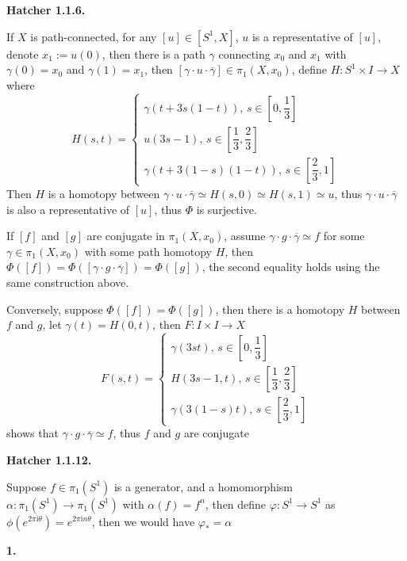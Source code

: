 \documentclass[../main.tex]{subfiles}
\begin{document}
\textbf{Hatcher 1.1.6.} \par
If $X$ is path-connected, for any $[u]\in [S^{1},X]$, $u$ is a representative of $[u]$, denote $x_{1}:=u(0)$, then there is a path $\gamma$ connecting $x_{0}$ and $x_{1}$ with $\gamma(0)=x_{0}$ and $\gamma(1)=x_{1}$, then $[\gamma\cdot u\cdot\overline{\gamma}]\in \pi_{1}(X,x_{0})$, define $H:S^{1}\times I\rightarrow X$ where
\[
H(s,t)=\left\{\begin{matrix}
\gamma\left( t+3s(1-t) \right), \, s\in[0,\dfrac{1}{3}]\\ 
u(3s-1), \, s\in[\dfrac{1}{3},\dfrac{2}{3}]\\ 
\gamma\left( t+3(1-s)(1-t) \right), \, s\in[\dfrac{2}{3},1]
\end{matrix}\right.
\]
Then $H$ is a homotopy between $\gamma\cdot u\cdot\overline{\gamma}\simeq H(s,0)\simeq H(s,1)\simeq u$, thus $\gamma\cdot u\cdot\overline{\gamma}$ is also a representative of $[u]$, thus $\Phi$ is surjective. \par
If $[f]$ and $[g]$ are conjugate in $\pi_{1}(X,x_{0})$, assume $\gamma\cdot g\cdot\overline{\gamma} \simeq f$ for some $\gamma\in\pi_{1}(X,x_{0})$ with some path homotopy $H$, then $\Phi([f])=\Phi([\gamma\cdot g\cdot\overline{\gamma}])=\Phi([g])$, the second equality holds using the same construction above. \par
Conversely, suppose $\Phi([f])=\Phi([g])$, then there is a homotopy $H$ between $f$ and $g$, let $\gamma(t) = H(0,t)$, then $F:I\times I\rightarrow X$
\[
F(s,t)=\left\{\begin{matrix}
\gamma\left(3st\right), \, s\in[0,\dfrac{1}{3}]\\ 
H\left(3s-1,t\right), \, s\in[\dfrac{1}{3},\dfrac{2}{3}]\\ 
\gamma\left(3(1-s)t\right), \, s\in[\dfrac{2}{3},1]
\end{matrix}\right.
\]
shows that $
\gamma\cdot g\cdot\overline{\gamma} \simeq f$, thus $f$ and $g$ are conjugate \par
\textbf{Hatcher 1.1.12.} \par
Suppose $f\in \pi_{1}(S^{1})$ is a generator, and a homomorphism $\alpha: \pi_{1}(S^{1})\rightarrow \pi_{1}(S^{1})$  with $\alpha(f)=f^{n}$, then define $\varphi: S^{1}\rightarrow S^{1}$ as $\phi(e^{2\pi \mathrm{i}\theta}) = e^{2\pi \mathrm{i}n\theta}$, then we would have $\varphi_{*}=\alpha$ \par
\textbf{1.} \par
\end{document}
